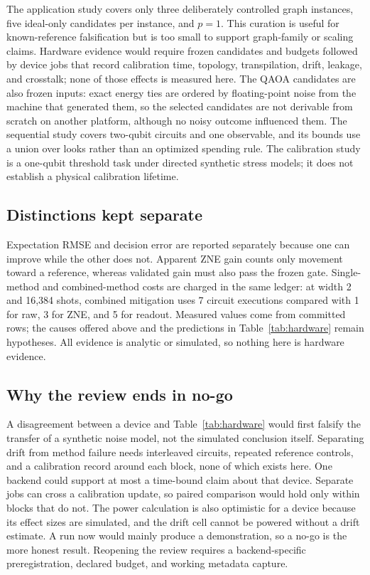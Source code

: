 \documentclass[10pt,twocolumn]{article}
\begin{document}
The application study covers only three deliberately controlled graph instances,
five ideal-only candidates per instance, and $p=1$. This curation is useful for
known-reference falsification but is too small to support graph-family or scaling
claims. Hardware evidence would require frozen candidates and budgets followed by
device jobs that record calibration time, topology, transpilation, drift, leakage,
and crosstalk; none of those effects is measured here.
The QAOA candidates are also frozen inputs: exact energy ties are ordered by floating-point noise
from the machine that generated them, so the selected candidates are not derivable from scratch on
another platform, although no noisy outcome influenced them.
The sequential study covers two-qubit circuits and one observable, and its bounds use a union
over looks rather than an optimized spending rule. The calibration study is a one-qubit threshold
task under directed synthetic stress models; it does not establish a physical calibration
lifetime.

\subsection{Distinctions kept separate}
Expectation RMSE and decision error are reported separately because one can improve while the
other does not. Apparent ZNE gain counts only movement toward a reference, whereas validated gain
must also pass the frozen gate. Single-method and combined-method costs are charged in the same
ledger: at width 2 and 16,384 shots, combined mitigation uses 7 circuit executions compared with 1
for raw, 3 for ZNE, and 5 for readout. Measured values come from committed rows; the causes offered
above and the predictions in Table~\ref{tab:hardware} remain hypotheses. All evidence is analytic
or simulated, so nothing here is hardware evidence.

\subsection{Why the review ends in no-go}
A disagreement between a device and Table~\ref{tab:hardware} would first falsify the transfer of
a synthetic noise model, not the simulated conclusion itself. Separating drift from method
failure needs interleaved circuits, repeated reference controls, and a calibration record around
each block, none of which exists here. One backend could support at most a time-bound claim about
that device. Separate jobs can cross a calibration update, so paired comparison would hold only
within blocks that do not. The power calculation is also optimistic for a device because its
effect sizes are simulated, and the drift cell cannot be powered without a drift estimate. A run now
would mainly produce a demonstration, so a no-go is the more honest result. Reopening the
review requires a backend-specific preregistration, declared budget, and working metadata capture.
\end{document}

